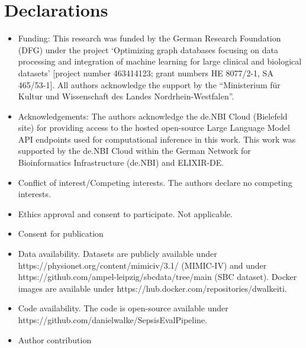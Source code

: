 \documentclass[pdflatex,sn-mathphys-num,lineno]{sn-jnl}
\theoremstyle{thmstyleone}%
\theoremstyle{thmstyletwo}%
\theoremstyle{thmstylethree}%
\begin{document}
\backmatter


\section*{Declarations}
\begin{itemize}
\item Funding: This research was funded by the German Research Foundation (DFG) under the project ‘Optimizing graph databases focusing on data processing and integration of machine learning for large clinical and biological datasets’ [project number 463414123; grant numbers HE 8077/2-1, SA 465/53-1]. All authors acknowledge the support by the “Ministerium für Kultur und Wissenschaft des Landes Nordrhein-Westfalen”.

\item Acknowledgements: The authors acknowledge the de.NBI Cloud (Bielefeld site) for providing access to the hosted open-source Large Language Model API endpoints used for computational inference in this work. This work was supported by the de.NBI Cloud within the German Network for Bioinformatics Infrastructure (de.NBI) and ELIXIR-DE.
\item Conflict of interest/Competing interests. The authors declare no competing interests. 
\item Ethics approval and consent to participate. Not applicable.
\item Consent for publication
\item Data availability. Datasets are publicly available under https://physionet.org/content/mimiciv/3.1/ (MIMIC-IV) and under https://github.com/ampel-leipzig/sbcdata/tree/main (SBC dataset). Docker images are available under https://hub.docker.com/repositories/dwalkeiti.
\item Code availability. The code is open-source available under https://github.com/danielwalke/SepsisEvalPipeline.
\item Author contribution
\end{itemize}


\end{document}
